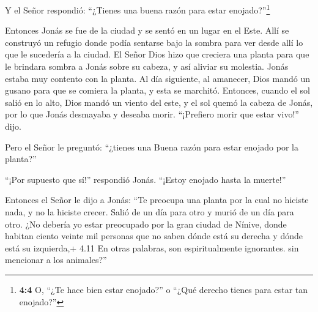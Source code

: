  Y el Señor respondió: ``¿Tienes una buena razón para estar
enojado?''\footnote{\textbf{4:4} O, ``¿Te hace bien estar enojado?'' o
  ``¿Qué derecho tienes para estar tan enojado?''}

 Entonces Jonás se fue de la ciudad y se sentó en un lugar
en el Este. Allí se construyó un refugio donde podía sentarse bajo la
sombra para ver desde allí lo que le sucedería a la ciudad. 
El Señor Dios hizo que creciera una planta para que le brindara sombra a
Jonás sobre su cabeza, y así aliviar su molestia. Jonás estaba muy
contento con la planta.  Al día siguiente, al amanecer, Dios
mandó un gusano para que se comiera la planta, y esta se marchitó.
 Entonces, cuando el sol salió en lo alto, Dios mandó un
viento del este, y el sol quemó la cabeza de Jonás, por lo que Jonás
desmayaba y deseaba morir. ``¡Prefiero morir que estar vivo!'' dijo.

 Pero el Señor le preguntó: ``¿tienes una Buena razón para
estar enojado por la planta?''

``¡Por supuesto que sí!'' respondió Jonás. ``¡Estoy enojado hasta la
muerte!''

 Entonces el Señor le dijo a Jonás: ``Te preocupa una
planta por la cual no hiciste nada, y no la hiciste crecer. Salió de un
día para otro y murió de un día para otro.  ¿No debería yo
estar preocupado por la gran ciudad de Nínive, donde habitan ciento
veinte mil personas que no saben dónde está su derecha y dónde está su
izquierda,+ 4.11 En otras palabras, son espiritualmente ignorantes. sin
mencionar a los animales?''
